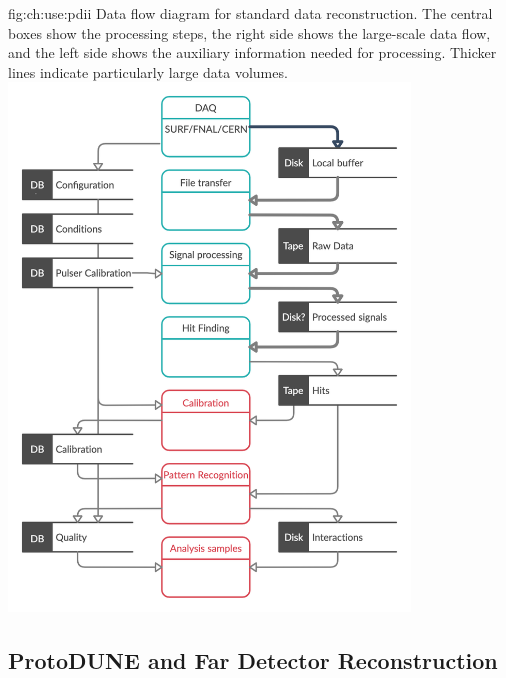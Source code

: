 \documentclass[../main-v1.tex]{subfiles}
\begin{document}

\begin{dunefigure}
{fig:ch:use:pdii}
{Data flow diagram for standard  data reconstruction. The central boxes show the processing steps, the right side shows the large-scale data flow,  and the left side shows the auxiliary information needed for processing. Thicker lines indicate particularly large data volumes.}
\includegraphics[width=0.8\textwidth]{graphics/IntroFigures/Data_processing_FD_v3.png}
\end{dunefigure}

\subsection{ProtoDUNE and Far Detector Reconstruction}\label{sec:use:pdii}
\end{document}
